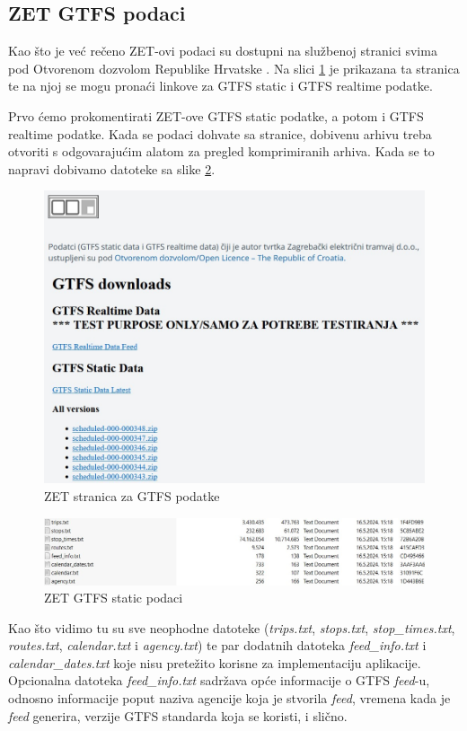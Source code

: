 \documentclass[zavrsnirad]{fer}
\begin{document}
\subsection{ZET GTFS podaci}
\label{sec:zet-gtfs}

Kao što je već rečeno ZET-ovi podaci su dostupni na službenoj stranici svima pod Otvorenom dozvolom Republike Hrvatske \cite{ZET-GTFS}. Na slici \ref{slk:zet-stranica} je prikazana ta stranica te na njoj se mogu pronaći linkove za GTFS static i GTFS realtime podatke.

Prvo ćemo prokomentirati ZET-ove GTFS static podatke, a potom i GTFS realtime podatke. Kada se podaci dohvate sa stranice, dobivenu arhivu treba otvoriti s odgovarajućim alatom za pregled komprimiranih arhiva. Kada se to napravi dobivamo datoteke sa slike \ref{slk:zet-podaci}.

\begin{figure}[htb]
	\centering
	\includegraphics[width=0.7\linewidth]{Figures/zet-stranica.jpg} 
	\caption{ZET stranica za GTFS podatke}
	\label{slk:zet-stranica}
\end{figure} 

\begin{figure}[htb]
	\centering
	\includegraphics[width=0.7\linewidth]{Figures/zet-podaci.jpg} 
	\caption{ZET GTFS static podaci}
	\label{slk:zet-podaci}
\end{figure} 

Kao što vidimo tu su sve neophodne datoteke (\textit{trips.txt}, \textit{stops.txt}, \textit{stop\_times.txt}, \textit{routes.txt}, \textit{calendar.txt} i \textit{agency.txt}) te par dodatnih datoteka \textit{feed\_info.txt} i \textit{calendar\_dates.txt} koje nisu pretežito korisne za implementaciju aplikacije. Opcionalna datoteka \textit{feed\_info.txt} sadržava opće informacije o GTFS \textit{feed}-u, odnosno  informacije poput naziva agencije koja je stvorila \textit{feed}, vremena kada je \textit{feed} generira, verzije GTFS standarda koja se koristi, i slično.
\end{document}
